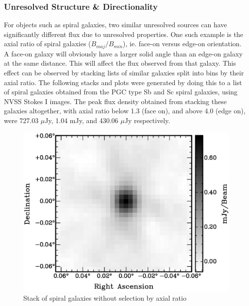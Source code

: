 \documentclass{article}
\begin{document}
\subsubsection{Unresolved Structure \& Directionality}
For objects such as spiral galaxies, two similar unresolved sources can have 
significantly different flux due to unresolved properties.  One such example
is the axial ratio of spiral galaxies ($B_{maj}/B_{min}$), ie. face-on versus 
edge-on orientation.  A face-on galaxy will obviously have a larger solid angle 
than an edge-on galaxy at the same distance.  This will affect the flux observed
from that galaxy.  This effect can be observed by stacking lists of similar 
galaxies split into bins by their axial ratio.  The following stacks and plots
were generated by doing this to a list of spiral galaxies obtained from 
the PGC type Sb and Sc spiral galaxies, using NVSS Stokes I images.  The peak
flux density obtained from stacking these galaxies altogether, with axial ratio
below 1.3 (face on), and above 4.0 (edge on), were 727.03 $\mu$Jy, 1.04 mJy, and
430.06 $\mu$Jy respectively.

\begin{figure}[H]
\centering
\includegraphics[scale=0.5]{spirals.eps}
\caption[Stacked spiral galaxies without axial ratio split]{Stack of spiral 
galaxies without selection by axial ratio}
\end{figure}
\end{document}
